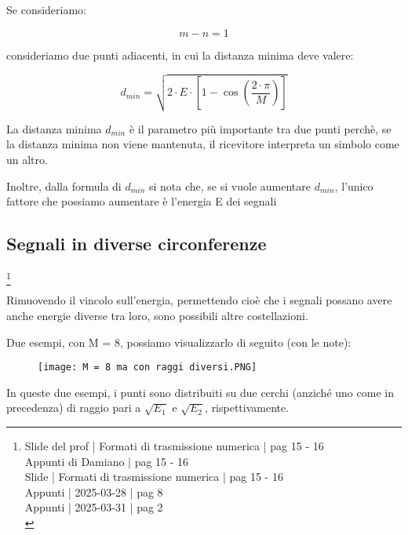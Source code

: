 Se consideriamo: 

{
    \Large 
    \begin{equation}
        m - n = 1
    \end{equation}
}

consideriamo due punti adiacenti, 
in cui la distanza minima deve valere: 

{
    \Large 
    \begin{equation}
        d_{min}
        = 
        \sqrt{2 \cdot E \cdot \left[ 1 - \cos(\frac{2 \cdot \pi}{M})\right]}
    \end{equation}
}

\begin{tcolorbox}
    La distanza minima $d_{min}$ è il parametro più importante tra due punti perchè, 
    se la distanza minima non viene mantenuta, 
    il ricevitore interpreta un simbolo come un altro. \newline 

    Inoltre, dalla formula di $d_{min}$ si nota che, 
    se si vuole aumentare $d_{min}$, l'unico fattore che possiamo aumentare è l'energia E dei segnali 
\end{tcolorbox}

\newpage 

\subsection{Segnali in diverse circonferenze}
\footnote{Slide del prof | Formati di trasmissione numerica | pag 15 - 16\\  
Appunti di Damiano | pag 15 - 16\\
Slide | Formati di trasmissione numerica | pag  15 - 16\\
Appunti | 2025-03-28 | pag 8 \\
Appunti | 2025-03-31 | pag 2 \\
}

Rimuovendo il vincolo sull'energia, 
permettendo cioè che i segnali possano avere anche energie diverse tra loro, 
sono possibili altre costellazioni. \newline 

Due esempi, con M = 8, possiamo visualizzarlo di seguito (con le note): 

\begin{figure}[h]
    \centering
    \texttt{[image: M = 8 ma con raggi diversi.PNG]}
\end{figure}

In queste due esempi, i punti sono distribuiti su due cerchi (anziché uno come in precedenza) di raggio pari a $\sqrt{E_1}$ e $\sqrt{E_2}$, 
rispettivamente. \newline 

